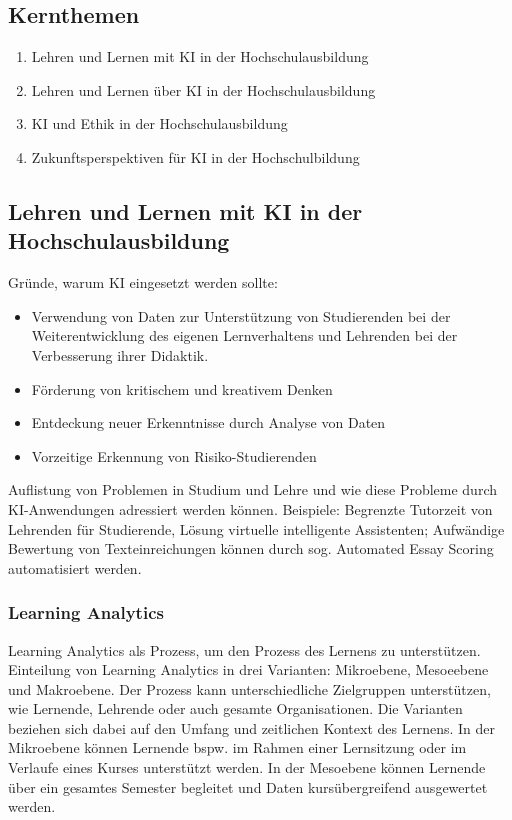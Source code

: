 \subsection*{Kernthemen}
\begin{enumerate}
    \item Lehren und Lernen mit KI in der Hochschulausbildung
    \item Lehren und Lernen über KI in der Hochschulausbildung
    \item KI und Ethik in der Hochschulausbildung
    \item Zukunftsperspektiven für KI in der Hochschulbildung
\end{enumerate}


\subsection{Lehren und Lernen mit KI in der Hochschulausbildung}

Gründe, warum KI eingesetzt werden sollte:
\begin{itemize}
    \item Verwendung von Daten zur Unterstützung von Studierenden bei der Weiterentwicklung des eigenen Lernverhaltens und Lehrenden bei der Verbesserung ihrer Didaktik.
    \item Förderung von kritischem und kreativem Denken
    \item Entdeckung neuer Erkenntnisse durch Analyse von Daten
    \item Vorzeitige Erkennung von Risiko-Studierenden
\end{itemize}

Auflistung von Problemen in Studium und Lehre und wie diese Probleme durch KI-Anwendungen adressiert werden können. Beispiele: Begrenzte Tutorzeit von Lehrenden für Studierende, Lösung virtuelle intelligente Assistenten; Aufwändige Bewertung von Texteinreichungen können durch sog. Automated Essay Scoring automatisiert werden.

\subsubsection*{Learning Analytics}
Learning Analytics als Prozess, um den Prozess des Lernens zu unterstützen. Einteilung von Learning Analytics in drei Varianten: Mikroebene, Mesoeebene und Makroebene. Der Prozess kann unterschiedliche Zielgruppen unterstützen, wie Lernende, Lehrende oder auch gesamte Organisationen. Die Varianten beziehen sich dabei auf den Umfang und zeitlichen Kontext des Lernens. In der Mikroebene können Lernende bspw. im Rahmen einer Lernsitzung oder im Verlaufe eines Kurses unterstützt werden. In der Mesoebene können Lernende über ein gesamtes Semester begleitet und Daten kursübergreifend ausgewertet werden.

